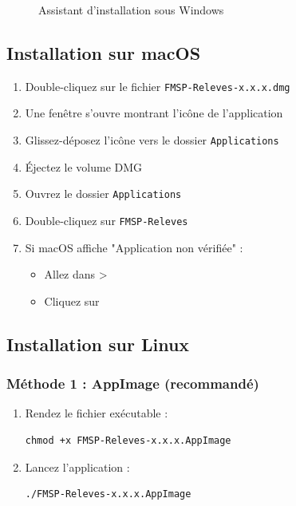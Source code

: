 \begin{figure}[h]
    \centering
    \caption{Assistant d'installation sous Windows}
\end{figure}

\subsection{Installation sur macOS}

\begin{enumerate}[leftmargin=*]
    \item Double-cliquez sur le fichier \texttt{FMSP-Releves-x.x.x.dmg}
    \item Une fenêtre s'ouvre montrant l'icône de l'application
    \item Glissez-déposez l'icône vers le dossier \texttt{Applications}
    \item Éjectez le volume DMG
    \item Ouvrez le dossier \texttt{Applications}
    \item Double-cliquez sur \texttt{FMSP-Releves}
    \item Si macOS affiche "Application non vérifiée" :
    \begin{itemize}
        \item Allez dans  > 
        \item Cliquez sur 
    \end{itemize}
\end{enumerate}

\subsection{Installation sur Linux}

\subsubsection{Méthode 1 : AppImage (recommandé)}

\begin{enumerate}[leftmargin=*]
    \item Rendez le fichier exécutable :
    \begin{verbatim}
chmod +x FMSP-Releves-x.x.x.AppImage
    \end{verbatim}
    \item Lancez l'application :
    \begin{verbatim}
./FMSP-Releves-x.x.x.AppImage
    \end{verbatim}
\end{enumerate}

